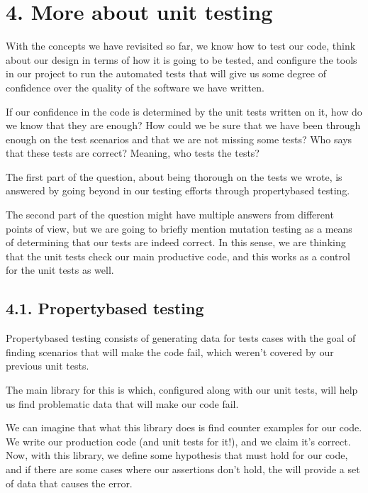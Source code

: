 \documentclass[a4paper,10pt,english]{sphinxmanual}
\begin{document}
\section{4. More about unit testing}
\label{\detokenize{chapters/8_unit_testing/index:more-about-unit-testing}}
With the concepts we have revisited so far, we know how to test our code, think about our
design in terms of how it is going to be tested, and configure the tools in our project to run
the automated tests that will give us some degree of confidence over the quality of the
software we have written.

If our confidence in the code is determined by the unit tests written on it, how do we know
that they are enough? How could we be sure that we have been through enough on the test
scenarios and that we are not missing some tests? Who says that these tests are correct?
Meaning, who tests the tests?

The first part of the question, about being thorough on the tests we wrote, is answered by
going beyond in our testing efforts through property\sphinxhyphen{}based testing.

The second part of the question might have multiple answers from different points of view,
but we are going to briefly mention mutation testing as a means of determining that our
tests are indeed correct. In this sense, we are thinking that the unit tests check our main
productive code, and this works as a control for the unit tests as well.


\subsection{4.1. Property\sphinxhyphen{}based testing}
\label{\detokenize{chapters/8_unit_testing/index:property-based-testing}}
Property\sphinxhyphen{}based testing consists of generating data for tests cases with the goal of finding
scenarios that will make the code fail, which weren’t covered by our previous unit tests.

The main library for this is  which, configured along with our unit tests, will
help us find problematic data that will make our code fail.

We can imagine that what this library does is find counter examples for our code. We write
our production code (and unit tests for it!), and we claim it’s correct. Now, with this library,
we define some hypothesis that must hold for our code, and if there are some cases where
our assertions don’t hold, the  will provide a set of data that causes the error.
\end{document}
